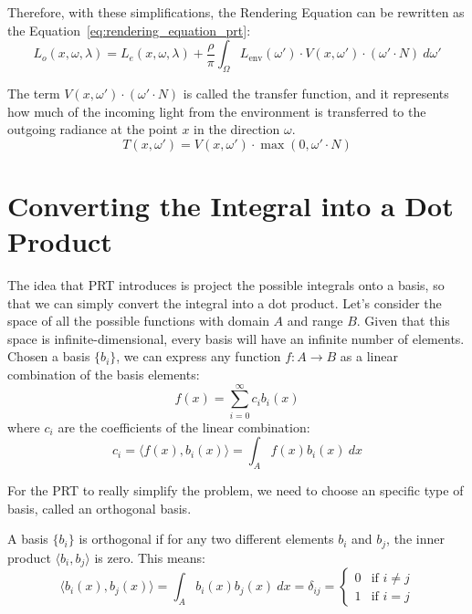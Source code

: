Therefore, with these simplifications, the Rendering Equation can be rewritten as the Equation~\eqref{eq:rendering_equation_prt}:
\begin{equation}
    L_o(x, \omega, \lambda) = L_e(x, \omega, \lambda) + \frac{\rho}{\pi} \int_{\Omega} L_{\text{env}}(\omega')\cdot V(x, \omega') \cdot (\omega' \cdot N)\ d\omega'
    \label{eq:rendering_equation_prt}
\end{equation}

The term $V(x, \omega')\cdot (\omega' \cdot N)$ is called the transfer function, and it represents how much of the incoming light from the environment is transferred to the outgoing radiance at the point $x$ in the direction $\omega$.
\begin{equation*}
    T(x, \omega') = V(x, \omega')\cdot \max(0,\omega' \cdot N)
\end{equation*}

\section{Converting the Integral into a Dot Product}

The idea that PRT introduces is project the possible integrals onto a basis, so that we can simply convert the integral into a dot product. Let's consider the space of all the possible functions with domain $A$ and range $B$. Given that this space is infinite-dimensional, every basis will have an infinite number of elements. Chosen a basis $\{b_i\}$, we can express any function $f: A \to B$ as a linear combination of the basis elements:
\begin{equation*}
    f(x) = \sum_{i=0}^{\infty} c_i b_i(x)
\end{equation*}
where $c_i$ are the coefficients of the linear combination:
\begin{equation*}
    c_i = \langle f(x), b_i(x) \rangle = \int_{A} f(x) b_i(x) \ dx
\end{equation*}

For the PRT to really simplify the problem, we need to choose an specific type of basis, called an orthogonal basis.
\begin{definicion}
    A basis $\{b_i\}$ is orthogonal if for any two different elements $b_i$ and $b_j$, the inner product $\langle b_i, b_j \rangle$ is zero. This means:
\begin{equation*}
    \langle b_i(x), b_j(x) \rangle = \int_{A} b_i(x) b_j(x) \ dx = \delta_{ij} = \begin{cases}
        0 & \text{if } i \neq j \\
        1 & \text{if } i = j
    \end{cases}
\end{equation*}
\end{definicion}

